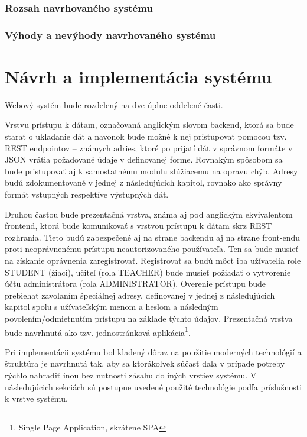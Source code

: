 \documentclass[12pt,oneside]{fithesis2}
\begin{document}
       		\subsection{Rozsah navrhovaného systému}
       		\subsection{Výhody a nevýhody navrhovaného systému}
    \chapter{Návrh a implementácia systému}
    
    \par Webový systém bude rozdelený na dve úplne oddelené časti.

\par Vrstvu prístupu k dátam, označovaná anglickým slovom backend, ktorá sa bude starať o ukladanie dát a navonok bude možné k nej pristupovať pomocou tzv. REST endpointov – známych adries, ktoré po prijatí dát v správnom formáte v JSON vrátia požadované údaje v definovanej forme. Rovnakým spôsobom sa bude pristupovať aj k samostatnému modulu slúžiacemu na opravu chýb. Adresy budú zdokumentované v jednej z následujúcich kapitol, rovnako ako správny formát vstupných respektíve výstupných dát. 
	\par Druhou časťou bude prezentačná vrstva, známa aj pod anglickým ekvivalentom frontend, ktorá bude komunikovať s vrstvou prístupu k dátam skrz REST rozhrania. Tieto budú zabezpečené aj na strane backendu aj na strane front-endu proti neoprávnenému prístupu neautorizovaného používateľa. Ten sa bude musieť na získanie oprávnenia zaregistrovať. Registrovať sa budú môcť iba užívatelia role STUDENT (žiaci), učiteľ (rola TEACHER) bude musieť požiadať o vytvorenie účtu administrátora (rola ADMINISTRATOR). Overenie prístupu bude prebiehať zavolaním špeciálnej adresy, definovanej v jednej z následujúcich kapitol spolu s užívateľským menom a heslom a následným povolením/odmietnutím prístupu na základe týchto údajov. Prezentačná vrstva bude navrhnutá ako tzv. jednostránková aplikácia\footnote{Single Page Application, skrátene SPA}.
	    \par Pri implementácii systému bol kladený dôraz na použitie moderných technológií a štruktúra je navrhnutá tak, aby sa ktorákoľvek súčasť dala v prípade potreby rýchlo nahradiť inou bez nutnosti zásahu do iných vrstiev systému. V následujúcich sekciách sú postupne uvedené použité technológie podľa príslušnosti k vrstve systému.
	    
\end{document}
